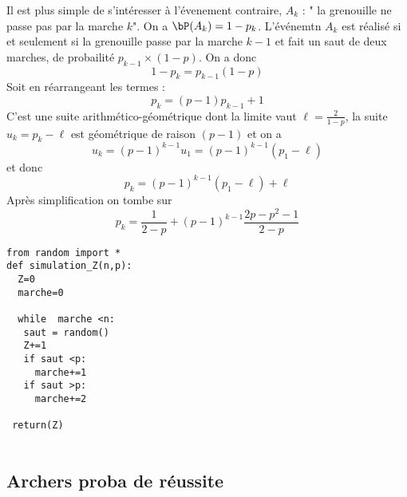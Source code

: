 \begin{correction}
\begin{enumerate}
Il est plus simple de s'intéresser à l'évenement contraire,  $A_k$ : " la grenouille ne passe pas par la marche $k$". On  a $\bP(A_k) =1-p_k$. L'événemtn $A_k$ est réalisé si et seulement si la grenouille passe par la marche $k-1$  et fait un saut de deux marches, de probailité $p_{k-1} \times (1-p)$. 
On  a donc 
$$1- p_k = p_{k-1} (1-p)$$
Soit en réarrangeant les termes : 
$$p_k = (p-1) p_{k-1} +1$$
C'est une suite arithmético-géométrique dont la limite vaut $\ell=\frac{2}{1-p}$, la suite 
$u_k = p_k -\ell $ est géométrique de raison $(p-1)$ et on  a
$$u_k =(p-1)^{k-1}  u_1 = (p-1)^{k-1} (p_1-\ell) $$
et donc 
$$p_k =  (p-1)^{k-1} (p_1-\ell) +\ell$$
Après simplification on tombe sur
$$p_k = \frac{1}{2-p} +(p-1)^{k-1}  \frac{2p-p^2 -1}{2-p}$$

\begin{lstlisting}
from random import *
def simulation_Z(n,p):
  Z=0
  marche=0

  while  marche <n:
   saut = random()
   Z+=1
   if saut <p:
     marche+=1
   if saut >p:
     marche+=2
 
 return(Z)
  	
\end{lstlisting}



\end{enumerate}



\end{correction}


\subsection{Archers proba de réussite}



